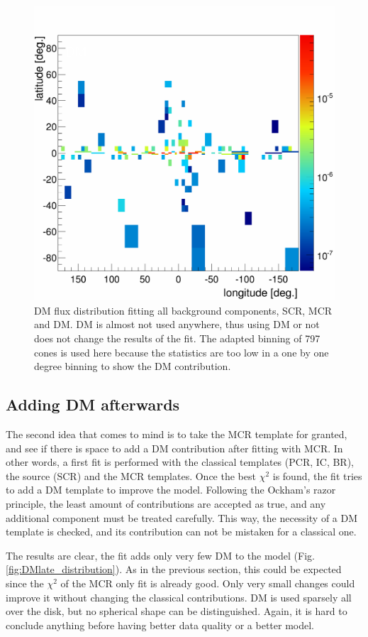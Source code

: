 \begin{figure}[H]
	\centering
	\includegraphics[width=.5\linewidth]{pic/discussion/DM+MCR_DM_distribution.png}
	\caption[DM distribution for a fit using DM and MCR]{DM flux distribution fitting all background components, SCR, MCR and DM. DM is almost not used anywhere, thus using DM or not does not change the results of the fit. The adapted binning of 797 cones is used here because the statistics are too low in a one by one degree binning to show the DM contribution.}
	\label{fig:DM+MCR_distribution}
\end{figure}

\newpage
\subsection{Adding DM afterwards}

The second idea that comes to mind is to take the MCR template for granted, and see if there is space to add a DM contribution after fitting with MCR. In other words, a first fit is performed with the classical templates (PCR, IC, BR), the source (SCR) and the MCR templates. Once the best $\chi^2$ is found, the fit tries to add a DM template to improve the model.
Following the Ockham's razor principle, the least amount of contributions are accepted as true, and any additional component must be treated carefully. This way, the necessity of a DM template is checked, and its contribution can not be mistaken for a classical one.

The results are clear, the fit adds only very few DM to the model (Fig. \ref{fig:DMlate_distribution}). As in the previous section, this could be expected since the $\chi^2$ of the MCR only fit is already good. Only very small changes could improve it without changing the classical contributions. DM is used sparsely all over the disk, but no spherical shape can be distinguished. Again, it is hard to conclude anything before having better data quality or a better model.

